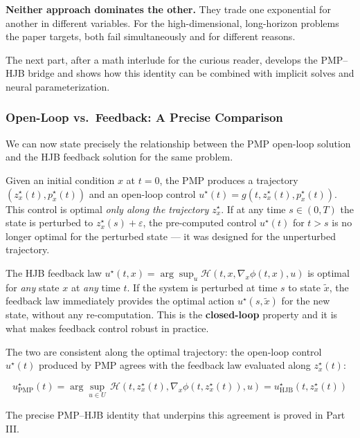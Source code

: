\documentclass{article}
\begin{document}
\textbf{Neither approach dominates the other.} They trade one exponential for another in different variables. For the high-dimensional, long-horizon problems the paper targets, both fail simultaneously and for different reasons.

The next part, after a math interlude for the curious reader, develops the PMP--HJB bridge and shows how this identity can be combined with implicit solves and neural parameterization. 



\subsubsection{Open-Loop vs.\ Feedback: A Precise Comparison}

\begin{tldrbox}
We can now state precisely the relationship between the PMP open-loop solution
and the HJB feedback solution for the same problem.

Given an initial condition $x$ at $t=0$, the PMP produces a trajectory
$(z_x^\star(t), p_x^\star(t))$ and an open-loop control $u^\star(t) =
g(t, z_x^\star(t), p_x^\star(t))$. This control is optimal \textit{only along
the trajectory $z_x^\star$}. If at any time $s \in (0,T)$ the state is perturbed
to $z_x^\star(s) + \varepsilon$, the pre-computed control $u^\star(t)$ for
$t > s$ is no longer optimal for the perturbed state --- it was designed for the
unperturbed trajectory.

The HJB feedback law $u^\star(t,x) = \arg\sup_u \mathcal{H}(t, x, \nabla_x
\phi(t,x), u)$ is optimal for \textit{any} state $x$ at \textit{any} time $t$.
If the system is perturbed at time $s$ to state $\tilde{x}$, the feedback law
immediately provides the optimal action $u^\star(s, \tilde{x})$ for the new
state, without any re-computation. This is the \textbf{closed-loop} property
and it is what makes feedback control robust in practice.

The two are consistent along the optimal trajectory: the open-loop control
$u^\star(t)$ produced by PMP agrees with the feedback law evaluated along
$z_x^\star(t)$:

\begin{equation}
    u^\star_{\text{PMP}}(t) = \arg\sup_{u \in U}\,
    \mathcal{H}(t, z_x^\star(t), \nabla_x\phi(t, z_x^\star(t)), u) = u^\star_{\text{HJB}}(t, z_x^\star(t))
\end{equation}

The precise PMP--HJB identity that underpins this agreement is proved in Part III.
\end{tldrbox}
\end{document}
